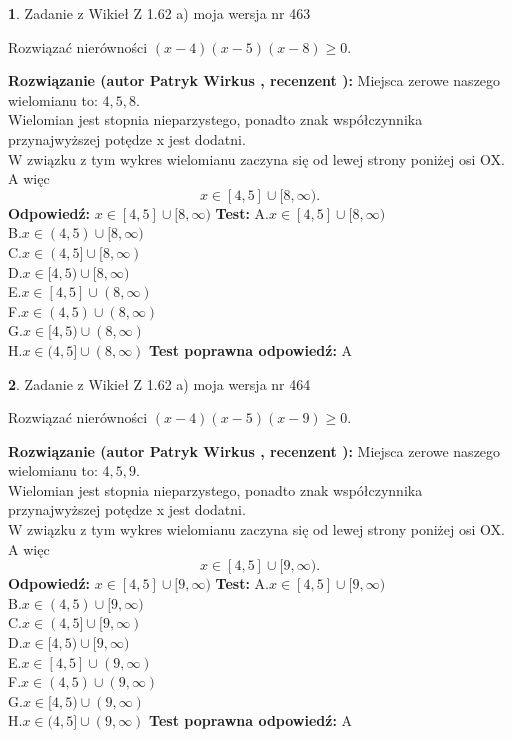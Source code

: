 \documentclass[12pt, a4paper]{article}
\theoremstyle{definition} %
\newtheorem{zad}{}
\newcommand{\zadStart}[1]{\begin{zad}#1\newline}
\newcommand{\zadStop}{\end{zad}}
\newcommand{\rozwStart}[2]{\noindent \textbf{Rozwiązanie (autor #1 , recenzent #2): }\newline}
\newcommand{\rozwStop}{\newline}
\newcommand{\odpStart}{\noindent \textbf{Odpowiedź:}\newline}
\newcommand{\odpStop}{\newline}
\newcommand{\testStart}{\noindent \textbf{Test:}\newline}
\newcommand{\testStop}{\newline}
\newcommand{\kluczStart}{\noindent \textbf{Test poprawna odpowiedź:}\newline}
\newcommand{\kluczStop}{\newline}
\begin{document}
\zadStart{Zadanie z Wikieł Z 1.62 a) moja wersja nr 463}

Rozwiązać nierówności $(x-4)(x-5)(x-8)\ge0$.
\zadStop
\rozwStart{Patryk Wirkus}{}
Miejsca zerowe naszego wielomianu to: $4, 5, 8$.\\
Wielomian jest stopnia nieparzystego, ponadto znak współczynnika przy\linebreak najwyższej potędze x jest dodatni.\\ W związku z tym wykres wielomianu zaczyna się od lewej strony poniżej osi OX. A więc $$x \in [4,5] \cup [8,\infty).$$
\rozwStop
\odpStart
$x \in [4,5] \cup [8,\infty)$
\odpStop
\testStart
A.$x \in [4,5] \cup [8,\infty)$\\
B.$x \in (4,5) \cup [8,\infty)$\\
C.$x \in (4,5] \cup [8,\infty)$\\
D.$x \in [4,5) \cup [8,\infty)$\\
E.$x \in [4,5] \cup (8,\infty)$\\
F.$x \in (4,5) \cup (8,\infty)$\\
G.$x \in [4,5) \cup (8,\infty)$\\
H.$x \in (4,5] \cup (8,\infty)$
\testStop
\kluczStart
A
\kluczStop



\zadStart{Zadanie z Wikieł Z 1.62 a) moja wersja nr 464}

Rozwiązać nierówności $(x-4)(x-5)(x-9)\ge0$.
\zadStop
\rozwStart{Patryk Wirkus}{}
Miejsca zerowe naszego wielomianu to: $4, 5, 9$.\\
Wielomian jest stopnia nieparzystego, ponadto znak współczynnika przy\linebreak najwyższej potędze x jest dodatni.\\ W związku z tym wykres wielomianu zaczyna się od lewej strony poniżej osi OX. A więc $$x \in [4,5] \cup [9,\infty).$$
\rozwStop
\odpStart
$x \in [4,5] \cup [9,\infty)$
\odpStop
\testStart
A.$x \in [4,5] \cup [9,\infty)$\\
B.$x \in (4,5) \cup [9,\infty)$\\
C.$x \in (4,5] \cup [9,\infty)$\\
D.$x \in [4,5) \cup [9,\infty)$\\
E.$x \in [4,5] \cup (9,\infty)$\\
F.$x \in (4,5) \cup (9,\infty)$\\
G.$x \in [4,5) \cup (9,\infty)$\\
H.$x \in (4,5] \cup (9,\infty)$
\testStop
\kluczStart
A
\kluczStop
\end{document}
